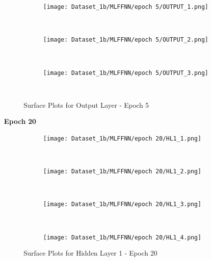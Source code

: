 \begin{figure}[!ht]
    \centering
    \begin{subfigure}[h]{0.5\textwidth}
        \centering
        \texttt{[image: Dataset\_1b/MLFFNN/epoch 5/OUTPUT\_1.png]}
    \end{subfigure}%
    ~ 
    \begin{subfigure}[h]{0.5\textwidth}
        \centering
        \texttt{[image: Dataset\_1b/MLFFNN/epoch 5/OUTPUT\_2.png]}
    \end{subfigure}%
    ~
    
    \begin{subfigure}[h]{0.4\textwidth}
        \centering
        \texttt{[image: Dataset\_1b/MLFFNN/epoch 5/OUTPUT\_3.png]}
    \end{subfigure}
    ~
    \caption{Surface Plots for Output Layer - Epoch 5}
    \label{fig:13}
\end{figure}





\textbf{Epoch 20}

\begin{figure}[!ht]
    \centering
    \begin{subfigure}[h]{0.5\textwidth}
        \centering
        \texttt{[image: Dataset\_1b/MLFFNN/epoch 20/HL1\_1.png]}
    \end{subfigure}%
    ~ 
    \begin{subfigure}[h]{0.5\textwidth}
        \centering
        \texttt{[image: Dataset\_1b/MLFFNN/epoch 20/HL1\_2.png]}
    \end{subfigure}%
    ~
    
    \begin{subfigure}[h]{0.4\textwidth}
        \centering
        \texttt{[image: Dataset\_1b/MLFFNN/epoch 20/HL1\_3.png]}
    \end{subfigure}
    ~
    \begin{subfigure}[h]{0.4\textwidth}
        \centering
        \texttt{[image: Dataset\_1b/MLFFNN/epoch 20/HL1\_4.png]}
    \end{subfigure}
    \caption{Surface Plots for Hidden Layer 1 - Epoch 20}
    \label{fig:13}
\end{figure}

\newpage

